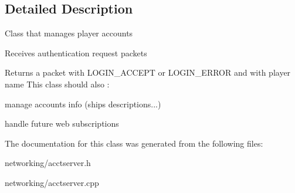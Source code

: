 \subsection{Detailed Description}
Class that manages player accounts
\begin{DoxyItemize}
\item Receives authentication request packets
\item Returns a packet with L\+O\+G\+I\+N\+\_\+\+A\+C\+C\+E\+PT or L\+O\+G\+I\+N\+\_\+\+E\+R\+R\+OR and with player name This class should also \+:
\item manage accounts info (ships descriptions...)
\item handle future web subscriptions 
\end{DoxyItemize}

The documentation for this class was generated from the following files\+:\begin{DoxyCompactItemize}
\item 
networking/acctserver.\+h\item 
networking/acctserver.\+cpp\end{DoxyCompactItemize}
